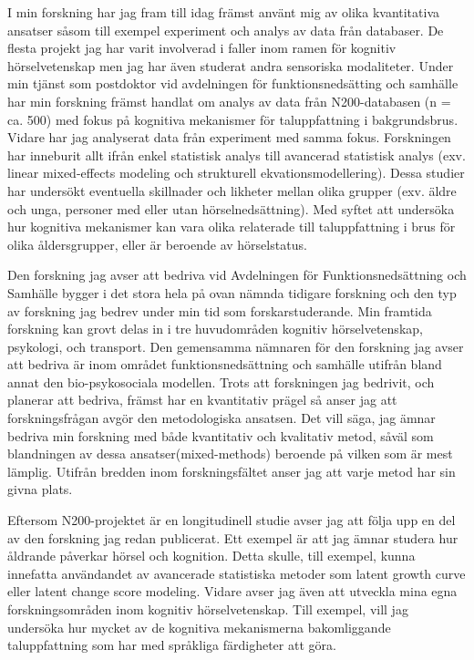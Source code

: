\documentclass[]{article}
\begin{document}
I min forskning har jag fram till idag främst använt mig av olika
kvantitativa ansatser såsom till exempel experiment och analys av data
från databaser. De flesta projekt jag har varit involverad i faller inom
ramen för kognitiv hörselvetenskap men jag har även studerat andra
sensoriska modaliteter. Under min tjänst som postdoktor vid avdelningen
för funktionsnedsätting och samhälle har min forskning främst handlat om
analys av data från N200-databasen (n = ca. 500) med fokus på kognitiva
mekanismer för taluppfattning i bakgrundsbrus. Vidare har jag analyserat
data från experiment med samma fokus. Forskningen har inneburit allt
ifrån enkel statistisk analys till avancerad statistisk analys (exv.
linear mixed-effects modeling och strukturell ekvationsmodellering).
Dessa studier har undersökt eventuella skillnader och likheter mellan
olika grupper (exv. äldre och unga, personer med eller utan
hörselnedsättning). Med syftet att undersöka hur kognitiva mekanismer
kan vara olika relaterade till taluppfattning i brus för olika
åldersgrupper, eller är beroende av hörselstatus.

\hfill\break
Den forskning jag avser att bedriva vid Avdelningen för
Funktionsnedsättning och Samhälle bygger i det stora hela på ovan nämnda
tidigare forskning och den typ av forskning jag bedrev under min tid som
forskarstuderande. Min framtida forskning kan grovt delas in i tre
huvudområden kognitiv hörselvetenskap, psykologi, och transport. Den
gemensamma nämnaren för den forskning jag avser att bedriva är inom
området funktionsnedsättning och samhälle utifrån bland annat den
bio-psykosociala modellen. Trots att forskningen jag bedrivit, och
planerar att bedriva, främst har en kvantitativ prägel så anser jag att
forskningsfrågan avgör den metodologiska ansatsen. Det vill säga, jag
ämnar bedriva min forskning med både kvantitativ och kvalitativ metod,
såväl som blandningen av dessa ansatser(mixed-methods) beroende på
vilken som är mest lämplig. Utifrån bredden inom forskningsfältet anser
jag att varje metod har sin givna plats.

\hfill\break
Eftersom N200-projektet är en longitudinell studie avser jag att följa
upp en del av den forskning jag redan publicerat. Ett exempel är att jag
ämnar studera hur åldrande påverkar hörsel och kognition. Detta skulle,
till exempel, kunna innefatta användandet av avancerade statistiska
metoder som latent growth curve eller latent change score modeling.
Vidare avser jag även att utveckla mina egna forskningsområden inom
kognitiv hörselvetenskap. Till exempel, vill jag undersöka hur mycket av
de kognitiva mekanismerna bakomliggande taluppfattning som har med
språkliga färdigheter att göra.
\end{document}
